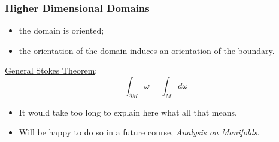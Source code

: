 \begin{frame}
\frametitle{Higher Dimensional Domains}

 \begin{center}
 \end{center}

\begin{itemize}
  \item the domain is oriented;
  \item the orientation of the domain induces an orientation of the boundary.
\end{itemize}



\underline{General Stokes Theorem}:
%
$$\boxed{\int_{\partial M} \omega = \int_M d\omega}$$
%

\begin{itemize}
  \item It would take too long to explain here what all that means,
  \item Will be happy to do so in a future course, \emph{Analysis on Manifolds}.
\end{itemize}

\end{frame}